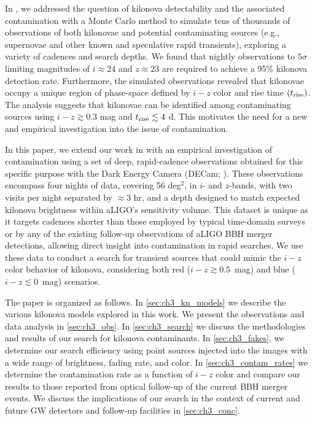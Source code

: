 In \citet[hereafter CB15]{CowpBerger15}, we addressed the question of kilonova detectability and the associated contamination with a Monte Carlo method to simulate tens of thousands of observations of both kilonovae and potential contaminating sources (e.g., supernovae and other known and speculative rapid transients), exploring a variety of cadences and search depths. We found that nightly observations to $5\sigma$ limiting magnitudes of $i \approx 24$ and $z \approx 23$ are required to achieve a 95\% kilonova detection rate. Furthermore, the simulated observations revealed that kilonovae occupy a unique region of phase-space defined by $i-z$ color and rise time $(t_{\rm rise})$. The analysis suggests that kilonovae can be identified among contaminating sources using $i-z\gtrsim 0.3$ mag and $t_{\rm rise}\lesssim 4$ d. This motivates the need for a new and empirical investigation into the issue of contamination.

In this paper, we extend our work in  with an empirical investigation of contamination using a set of deep, rapid-cadence observations obtained for this specific purpose with the Dark Energy Camera (DECam; \citealt{Flaugher+15}). These observations encompass four nights of data, covering 56 deg$^2$, in $i$- and $z$-bands, with two visits per night separated by $\approx 3$ hr, and a depth designed to match expected kilonova brightness within aLIGO's sensitivity volume. This dataset is unique as it targets cadences shorter than those employed by typical time-domain surveys or by any of the existing follow-up observations of aLIGO BBH merger detections, allowing direct insight into contamination in rapid searches. We use these data to conduct a search for transient sources that could mimic the $i-z$ color behavior of kilonova, considering both red ($i-z \gtrsim 0.5$~mag) and blue ($i-z \lesssim 0$~mag) scenarios.

The paper is organized as follows. In \cref{sec:ch3_kn_models} we describe the various kilonova models explored in this work. We present the observations and data analysis in \cref{sec:ch3_obs}. In \cref{sec:ch3_search} we discuss the methodologies and results of our search for kilonova contaminants. In \cref{sec:ch3_fakes}, we determine our search efficiency using point sources injected into the images with a wide range of brightness, fading rate, and color. In \cref{sec:ch3_contam_rates} we determine the contamination rate as a function of $i-z$ color and compare our results to those reported from optical follow-up of the current BBH merger events. We discuss the implications of our search in the context of current and future GW detectors and follow-up facilities in \cref{sec:ch3_conc}.

